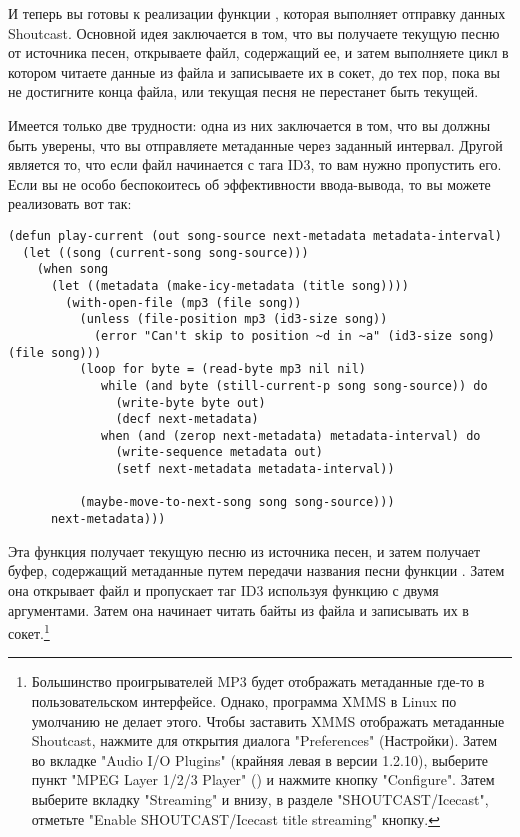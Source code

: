 И теперь вы готовы к реализации функции , которая выполняет отправку
данных Shoutcast.  Основной идея заключается в том, что вы получаете текущую песню от
источника песен, открываете файл, содержащий ее, и затем выполняете цикл в котором читаете
данные из файла и записываете их в сокет, до тех пор, пока вы не достигните конца файла,
или текущая песня не перестанет быть текущей.

Имеется только две трудности: одна из них заключается в том, что вы должны быть уверены,
что вы отправляете метаданные через заданный интервал.  Другой является то, что если файл
начинается с тага ID3, то вам нужно пропустить его.  Если вы не особо беспокоитесь об
эффективности ввода-вывода, то вы можете реализовать  вот так:

\begin{lstlisting}
(defun play-current (out song-source next-metadata metadata-interval)
  (let ((song (current-song song-source)))
    (when song
      (let ((metadata (make-icy-metadata (title song))))
        (with-open-file (mp3 (file song))
          (unless (file-position mp3 (id3-size song))
            (error "Can't skip to position ~d in ~a" (id3-size song) (file song)))
          (loop for byte = (read-byte mp3 nil nil)
             while (and byte (still-current-p song song-source)) do
               (write-byte byte out)
               (decf next-metadata)
             when (and (zerop next-metadata) metadata-interval) do
               (write-sequence metadata out)
               (setf next-metadata metadata-interval))

          (maybe-move-to-next-song song song-source)))
      next-metadata)))
\end{lstlisting}

Эта функция получает текущую песню из источника песен, и затем получает буфер, содержащий
метаданные путем передачи названия песни функции .  Затем она
открывает файл и пропускает таг ID3 используя функцию  с двумя
аргументами.  Затем она начинает читать байты из файла и записывать их в
сокет.\footnote{Большинство проигрывателей MP3 будет отображать метаданные где-то в
  пользовательском интерфейсе.  Однако, программа XMMS в Linux по умолчанию не делает
  этого. Чтобы заставить XMMS отображать метаданные Shoutcast, нажмите  для
  открытия диалога "Preferences" (Настройки).  Затем во вкладке "Audio I/O Plugins"
  (крайняя левая в версии 1.2.10), выберите пункт "MPEG Layer 1/2/3 Player"
  () и нажмите кнопку "Configure".  Затем выберите вкладку "Streaming"
  и внизу, в разделе "SHOUTCAST/Icecast", отметьте "Enable SHOUTCAST/Icecast title
  streaming" кнопку.}

